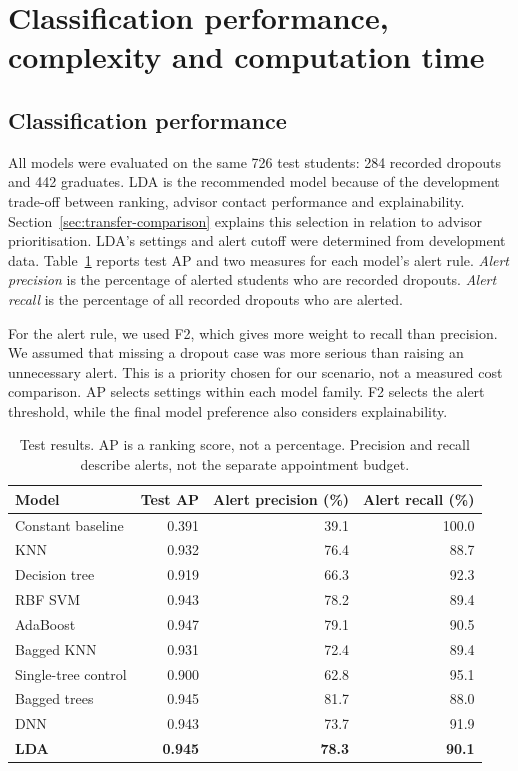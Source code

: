 \section{Classification performance, complexity and computation time}
\label{sec:final-evaluation}

\subsection{Classification performance}
All models were evaluated on the same 726 test students: 284 recorded dropouts
and 442 graduates. LDA is the recommended model because of the development
trade-off between ranking, advisor contact performance and explainability.
Section~\ref{sec:transfer-comparison} explains this selection in relation to advisor prioritisation.
LDA's settings and alert cutoff were determined from development data.
Table~\ref{tab:final-performance} reports test AP and two measures for each
model's alert rule. \emph{Alert precision} is the percentage of alerted students
who are recorded dropouts. \emph{Alert recall} is the percentage of all recorded
dropouts who are alerted.

For the alert rule, we used F2, which gives more weight to recall than precision.
We assumed that missing a dropout case was more serious than raising an
unnecessary alert. This is a priority chosen for our scenario, not a measured
cost comparison. AP selects settings within each model family. F2 selects the
alert threshold, while the final model preference also considers explainability.

\begin{table}[H]
\centering
\small
\caption[Held-out classification performance]{Test results. AP is a ranking score, not a percentage. Precision and
recall describe alerts, not the separate appointment budget.}
\label{tab:final-performance}
\begin{tabular}{@{}lrrr@{}}
\toprule
Model & Test AP & Alert precision (\%) & Alert recall (\%) \\
\midrule
Constant baseline & 0.391 & 39.1 & 100.0 \\
KNN & 0.932 & 76.4 & 88.7 \\
Decision tree & 0.919 & 66.3 & 92.3 \\
RBF SVM & 0.943 & 78.2 & 89.4 \\
AdaBoost & 0.947 & 79.1 & 90.5 \\
Bagged KNN & 0.931 & 72.4 & 89.4 \\
Single-tree control & 0.900 & 62.8 & 95.1 \\
Bagged trees & 0.945 & 81.7 & 88.0 \\
DNN & 0.943 & 73.7 & 91.9 \\
\textbf{LDA} & \textbf{0.945} & \textbf{78.3} & \textbf{90.1} \\
\bottomrule
\end{tabular}
\end{table}

